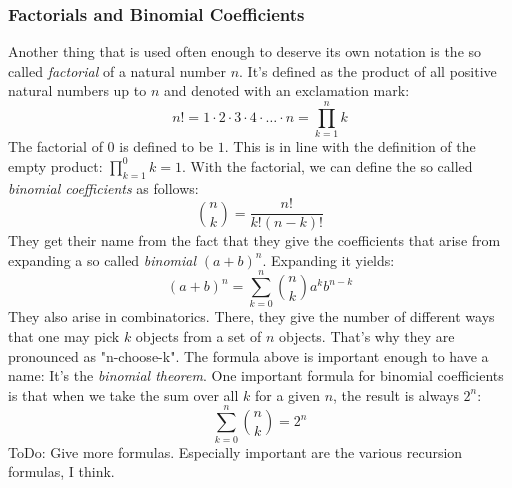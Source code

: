\subsubsection{Factorials and Binomial Coefficients}
\label{Sec:FactorialsAndBinomCoeffs}
Another thing that is used often enough to deserve its own notation is the so called \emph{factorial} of a natural number $n$. It's defined as the product of all positive natural numbers up to $n$ and denoted with an exclamation mark:
\begin{equation}
 n! = 1 \cdot 2 \cdot 3 \cdot 4 \cdot \ldots \cdot n = \prod_{k=1}^{n} k
\end{equation}
The factorial of $0$ is defined to be $1$. This is in line with the definition of the empty product: $\prod_{k=1}^{0} k = 1$. With the factorial, we can define the so called \emph{binomial coefficients} as follows:
\begin{equation}
\label{Eq:BinomialCoeffs}
 \binom{n}{k} = \frac{n!}{k! (n-k)!}
\end{equation}
They get their name from the fact that they give the coefficients that arise from expanding a so called \emph{binomial} $(a+b)^n$. Expanding it yields:
\begin{equation}
\label{Eq:BinomialTheorem}
(a+b)^n = \sum_{k=0}^{n} \binom{n}{k} a^k b^{n-k}
\end{equation}
They also arise in combinatorics. There, they give the number of different ways that one may pick $k$ objects from a set of $n$ objects. That's why they are pronounced as "n-choose-k". The formula above is important enough to have a name: It's the \emph{binomial theorem}. One important formula for binomial coefficients is that when we take the sum over all $k$ for a given $n$, the result is always $2^n$:
\begin{equation}
\label{Eq:BinomialCoeffsSum}
\sum_{k=0}^n \binom{n}{k} = 2^n
\end{equation}
ToDo: Give more formulas. Especially important are the various recursion formulas, I think.




